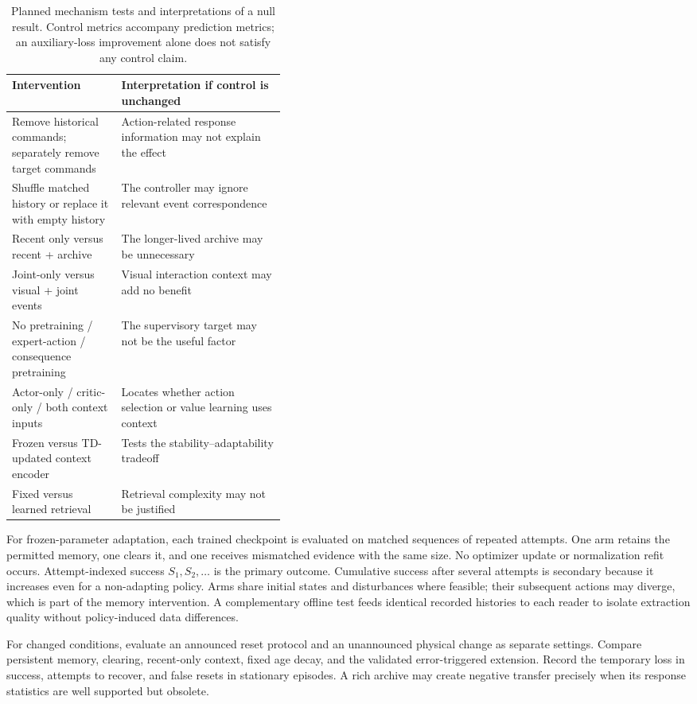 \documentclass[10pt,letterpaper]{article}
\begin{document}
\begin{table}[t]
\centering\small
\caption{Planned mechanism tests and interpretations of a null result. Control metrics accompany prediction metrics; an auxiliary-loss improvement alone does not satisfy any control claim.}
\label{tab:ablations}
\begin{tabularx}{\linewidth}{@{}p{0.40\linewidth}Y@{}}
\toprule
Intervention & Interpretation if control is unchanged \\
\midrule
Remove historical commands; separately remove target commands & Action-related response information may not explain the effect \\
Shuffle matched history or replace it with empty history & The controller may ignore relevant event correspondence \\
Recent only versus recent + archive & The longer-lived archive may be unnecessary \\
Joint-only versus visual + joint events & Visual interaction context may add no benefit \\
No pretraining / expert-action / consequence pretraining & The supervisory target may not be the useful factor \\
Actor-only / critic-only / both context inputs & Locates whether action selection or value learning uses context \\
Frozen versus TD-updated context encoder & Tests the stability--adaptability tradeoff \\
Fixed versus learned retrieval & Retrieval complexity may not be justified \\
\bottomrule
\end{tabularx}
\end{table}

For frozen-parameter adaptation, each trained checkpoint is evaluated on matched sequences of repeated attempts. One arm retains the permitted memory, one clears it, and one receives mismatched evidence with the same size. No optimizer update or normalization refit occurs. Attempt-indexed success $S_1,S_2,\ldots$ is the primary outcome. Cumulative success after several attempts is secondary because it increases even for a non-adapting policy. Arms share initial states and disturbances where feasible; their subsequent actions may diverge, which is part of the memory intervention. A complementary offline test feeds identical recorded histories to each reader to isolate extraction quality without policy-induced data differences.

For changed conditions, evaluate an announced reset protocol and an unannounced physical change as separate settings. Compare persistent memory, clearing, recent-only context, fixed age decay, and the validated error-triggered extension. Record the temporary loss in success, attempts to recover, and false resets in stationary episodes. A rich archive may create negative transfer precisely when its response statistics are well supported but obsolete.
\end{document}
